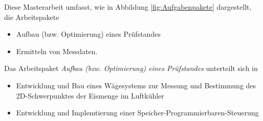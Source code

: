 Diese Masterarbeit umfasst, wie in Abbildung \ref{fig:Aufgabenpakete} dargestellt, die Arbeitspakete 

\begin{itemize}
\item	Aufbau (bzw. Optimierung) eines Prüfstandes
\item	Ermitteln von Messdaten.
\end{itemize}

Das Arbeitspaket \textit{Aufbau (bzw. Optimierung) eines Prüfstandes} unterteilt sich in 

\begin{itemize}
\item Entwicklung und Bau eines Wägesystems zur Messung und Bestimmung des 2D-Schwerpunktes der Eismenge im Luftkühler
\item Entwicklung und Implemtierung einer Speicher-Programmierbaren-Steuerung
\end{itemize}



